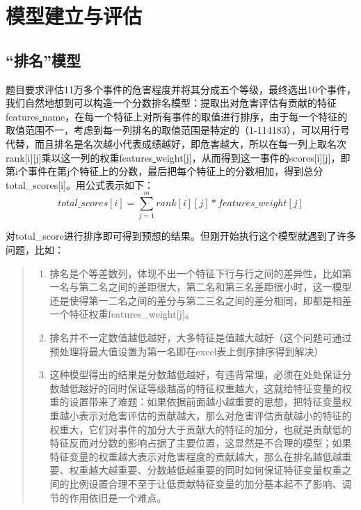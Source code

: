 \documentclass{cumcmthesis}
\begin{document}
\newpage
\section{模型建立与评估}

\subsection{“排名”模型}
题目要求评估11万多个事件的危害程度并将其分成五个等级，最终选出10个事件，我们自然地想到可以构造一个分数排名模型：提取出对危害评估有贡献的特征features\uline{ }name，在每一个特征上对所有事件的取值进行排序，由于每一个特征的取值范围不一，考虑到每一列排名的取值范围是特定的（1-114183），可以用行号代替，而且排名是名次越小代表成绩越好，即危害越大，所以在每一列上取名次rank[i][j]乘以这一列的权重features\uline{ }weight[j]，从而得到这一事件的scores[i][j]，即第i个事件在第j个特征上的分数，最后把每个特征上的分数相加，得到总分total\_scores[i]。用公式表示如下：
 \begin{equation} 
 total\_scores[i]=\sum_{j=1}^m rank[i][j]*features\_weight[j] 
 \end{equation}
 \par
对total\_score进行排序即可得到预想的结果。但刚开始执行这个模型就遇到了许多问题，比如：
\begin{quote}
\begin{enumerate} 
	\item 排名是个等差数列，体现不出一个特征下行与行之间的差异性，比如第一名与第二名之间的差距很大，第二名和第三名差距很小时，这一模型还是使得第一二名之间的差分与第二三名之间的差分相同，即都是相差一个特征权重features\_weight[j]。
	\item 排名并不一定数值越低越好，大多特征是值越大越好（这个问题可通过预处理将最大值设置为第一名即在excel表上倒序排序得到解决）
	\item 这种模型得出的结果是分数越低越好，有违背常理，必须在处处保证分数越低越好的同时保证等级越高的特征权重越大，这就给特征变量的权重的设置带来了难题：如果依据前面越小越重要的思想，把特征变量权重越小表示对危害评估的贡献越大，那么对危害评估贡献越小的特征的权重大，它们对事件的加分大于贡献大的特征的加分，也就是贡献低的特征反而对分数的影响占据了主要位置，这显然是不合理的模型；如果特征变量的权重越大表示对危害程度的贡献越大，那么在排名越低越重要、权重越大越重要、分数越低越重要的同时如何保证特征变量权重之间的比例设置合理不至于让低贡献特征变量的加分基本起不了影响、调节的作用依旧是一个难点。
\end{enumerate} 
\end{quote}
\end{document}
